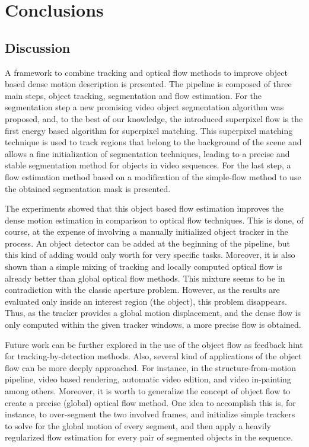 \chapter{Conclusions} \label{chap:conclusion}

\section{Discussion} \label{sec:discussion}

A framework to combine tracking and optical flow methods to improve 
object based dense motion description is presented. The pipeline is 
composed of three main steps, object tracking, segmentation and 
flow estimation. For the segmentation step a new promising video object 
segmentation algorithm was proposed, and, to the best of our knowledge, 
the introduced superpixel flow is the first energy based algorithm for superpixel matching.
This superpixel matching technique is used to track regions that belong to the background of the 
scene and allows a fine initialization of segmentation techniques, leading to a precise and stable 
segmentation method for objects in video sequences.
For the last step, a flow estimation method based on a modification of the simple-flow method to use 
the obtained segmentation mask is presented. 

The experiments showed that this object based flow estimation improves the dense motion 
estimation in comparison to optical flow techniques. This is done, of course, at the expense of involving a manually 
initialized object tracker in the process. An object detector can be added at the beginning of the pipeline, but this kind of adding would only 
worth for very specific tasks. Moreover, it is also shown than a simple 
mixing of tracking and locally computed optical flow is already better than global optical flow methods. 
This mixture seems to be in contradiction with the classic aperture problem. However, as the results are evaluated only inside an interest region (the object), this problem disappears. Thus, as the tracker provides 
a global motion displacement, and the dense flow is only computed within the given tracker windows, a 
more precise flow is obtained.


Future work can be further explored in the use of the object flow as feedback hint for tracking-by-detection methods. Also, 
several kind of applications of the object flow can be more deeply approached. For instance, 
in the structure-from-motion pipeline, video based rendering, automatic video edition, and video in-painting  among others.
Moreover, it is worth to generalize the concept of object flow to create a precise (global) optical flow method. One idea to accomplish 
this is, for instance, to over-segment the two involved frames, and initialize simple trackers to solve for the global motion of every segment, and 
then apply a heavily regularized flow estimation for every pair of segmented objects in the sequence.

